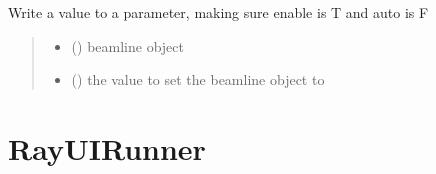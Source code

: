 \documentclass[letterpaper,10pt,english]{sphinxmanual}
\begin{document}
\begin{fulllineitems}
\begin{fulllineitems}
\end{fulllineitems}


\begin{fulllineitems}
\label{\detokenize{index:raypyng.simulate.SimulationParams._write_value_to_param}}
\pysigstartsignatures
{}
\pysigstopsignatures
\sphinxAtStartPar
Write a value to a parameter, making sure enable is T
and auto is F
\begin{quote}\begin{description}
\begin{itemize}
\item {} 
\sphinxAtStartPar
{} () \textendash{} beamline object

\item {} 
\sphinxAtStartPar
{} (\sphinxstyleliteralemphasis{\sphinxupquote{,}}\sphinxstyleliteralemphasis{\sphinxupquote{,}}) \textendash{} the value to set the beamline object to

\end{itemize}

\end{description}\end{quote}

\end{fulllineitems}


\end{fulllineitems}



\chapter{RayUIRunner}
\label{\detokenize{index:rayuirunner}}
\end{document}
